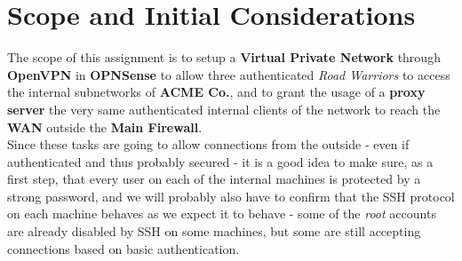 \section{Scope and Initial Considerations}
The scope of this assignment is to setup a \textbf{Virtual Private Network} through \textbf{OpenVPN} in \textbf{OPNSense} to allow three authenticated \textit{Road Warriors} to access the internal subnetworks of \textbf{ACME Co.}, and to grant the usage of a \textbf{proxy server} the very same authenticated internal clients of the network to reach the \textbf{WAN} outside the \textbf{Main Firewall}.\\
Since these tasks are going to allow connections from the outside - even if authenticated and thus probably secured - it is a good idea to make sure, as a first step, that every user on each of the internal machines is protected by a strong password, and we will probably also have to confirm that the SSH protocol on each machine behaves as we expect it to behave - some of the \textit{root} accounts are already disabled by SSH on some machines, but some are still accepting connections based on basic authentication.
